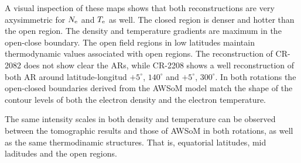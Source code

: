 \documentclass[namedreferences]{solarphysics}
\newcommand{\mdeg}{^\circ}
\newcommand{\Te}{T_{\rm e}}
\newcommand{\Ne}{N_{\rm e}}
\def\diego#1{\textcolor{red}{#1}}
\begin{document}
\begin{article}
A visual inspection of these maps shows that both reconstructions are very axysimmetric for $\Ne$ and $\Te$ as well. The closed region is denser and hotter than the open region. The density and temperature gradients are maximum in the open-close boundary. The open field regions in low latitudes maintain thermodynamic values associated with open regions. The reconstruction of CR-2082 does not show clear the ARs, while CR-2208 shows a well reconstruction of both AR around latitude-longitud $+5\mdeg$, $140\mdeg$ and $+5\mdeg$, $300\mdeg$. In both rotations the open-closed boundaries derived from the AWSoM model match the shape of the contour levels of both the electron density and the electron temperature.


The same intensity scales in both density and temperature can be observed between the tomographic results and those of AWSoM in both rotations, as well as the same thermodinamic structures. That is, equatorial latitudes, mid laditudes and the open regions.


\end{article}
\end{document}
